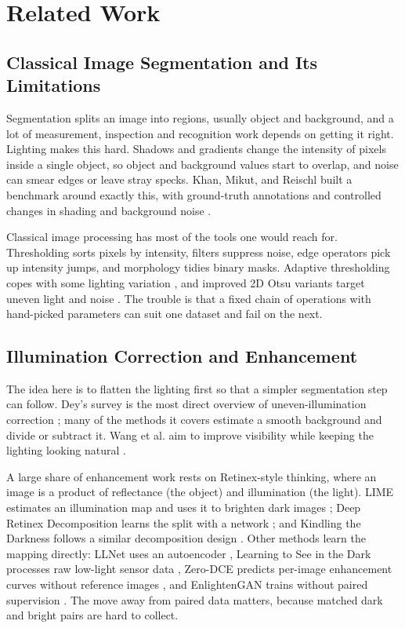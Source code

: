 \documentclass[11pt,a4paper]{article}
\begin{document}
\section{Related Work}

\subsection{Classical Image Segmentation and Its Limitations}

Segmentation splits an image into regions, usually object and background, and a lot of measurement, inspection and recognition work depends on getting it right. Lighting makes this hard. Shadows and gradients change the intensity of pixels inside a single object, so object and background values start to overlap, and noise can smear edges or leave stray specks. Khan, Mikut, and Reischl built a benchmark around exactly this, with ground-truth annotations and controlled changes in shading and background noise \cite{khan2015}.

Classical image processing has most of the tools one would reach for. Thresholding sorts pixels by intensity, filters suppress noise, edge operators pick up intensity jumps, and morphology tidies binary masks. Adaptive thresholding copes with some lighting variation \cite{yazid2013,cai2013,pattnaik2021,pattnaik2024}, and improved 2D Otsu variants target uneven light and noise \cite{guo2014,sha2016,xing2020}. The trouble is that a fixed chain of operations with hand-picked parameters can suit one dataset and fail on the next.

\subsection{Illumination Correction and Enhancement}

The idea here is to flatten the lighting first so that a simpler segmentation step can follow. Dey's survey is the most direct overview of uneven-illumination correction \cite{dey2019}; many of the methods it covers estimate a smooth background and divide or subtract it. Wang et al. aim to improve visibility while keeping the lighting looking natural \cite{wang2013}.

A large share of enhancement work rests on Retinex-style thinking, where an image is a product of reflectance (the object) and illumination (the light). LIME estimates an illumination map and uses it to brighten dark images \cite{guo2017lime}; Deep Retinex Decomposition learns the split with a network \cite{wei2018}; and Kindling the Darkness follows a similar decomposition design \cite{jiang2019kind}. Other methods learn the mapping directly: LLNet uses an autoencoder \cite{lore2017}, Learning to See in the Dark processes raw low-light sensor data \cite{chen2018dark}, Zero-DCE predicts per-image enhancement curves without reference images \cite{guo2020zerodce}, and EnlightenGAN trains without paired supervision \cite{jiang2021enlightengan}. The move away from paired data matters, because matched dark and bright pairs are hard to collect.
\end{document}
